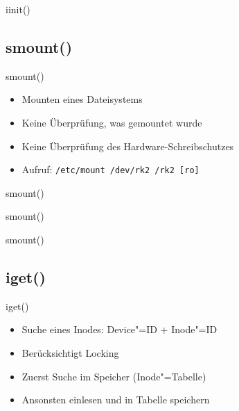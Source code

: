 \documentclass{beamer}
\begin{document}
\begin{frame}{iinit()}
\end{frame}




\subsection{smount()}

\begin{frame}{smount()}
    \begin{itemize}
        \item Mounten eines Dateisystems
        \item Keine Überprüfung, was gemountet wurde
        \item Keine Überprüfung des Hardware-Schreibschutzes
        \medskip
        \item Aufruf: \texttt{/etc/mount /dev/rk2 /rk2 [ro]}
    \end{itemize}
\end{frame}
\begin{frame}{smount()}
\end{frame}

\begin{frame}{smount()}
\end{frame}

\begin{frame}{smount()}
\end{frame}




\subsection{iget()}

\begin{frame}{iget()}
    \begin{itemize}
        \item Suche eines Inodes: Device"=ID + Inode"=ID
        \item Berücksichtigt Locking

        \bigskip

        \item Zuerst Suche im Speicher (Inode"=Tabelle)
        \item Ansonsten einlesen und in Tabelle speichern
    \end{itemize}
\end{frame}
\end{document}
